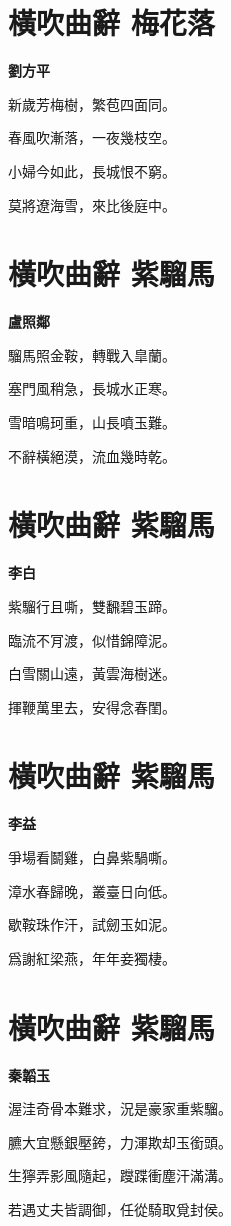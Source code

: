 \documentclass[12pt,a4paper]{ctexbook}
\begin{document}
\section{橫吹曲辭 梅花落}
\textbf{劉方平}\par\vspace{0.5em}
新歲芳梅樹，繁苞四面同。\par
春風吹漸落，一夜幾枝空。\par
小婦今如此，長城恨不窮。\par
莫將遼海雪，來比後庭中。\par

\section{橫吹曲辭 紫騮馬}
\textbf{盧照鄰}\par\vspace{0.5em}
騮馬照金鞍，轉戰入皐蘭。\par
塞門風稍急，長城水正寒。\par
雪暗鳴珂重，山長噴玉難。\par
不辭橫絕漠，流血幾時乾。\par

\section{橫吹曲辭 紫騮馬}
\textbf{李白}\par\vspace{0.5em}
紫騮行且嘶，雙飜碧玉蹄。\par
臨流不肎渡，似惜錦障泥。\par
白雪關山遠，黃雲海樹迷。\par
揮鞭萬里去，安得念春閨。\par

\section{橫吹曲辭 紫騮馬}
\textbf{李益}\par\vspace{0.5em}
爭場看鬬雞，白鼻紫騧嘶。\par
漳水春歸晚，叢臺日向低。\par
歇鞍珠作汗，試劒玉如泥。\par
爲謝紅梁燕，年年妾獨棲。\par

\section{橫吹曲辭 紫騮馬}
\textbf{秦韜玉}\par\vspace{0.5em}
渥洼奇骨本難求，況是豪家重紫騮。\par
臕大宜懸銀壓銙，力渾欺却玉銜頭。\par
生獰弄影風隨起，躞蹀衝塵汗滿溝。\par
若遇丈夫皆調御，任從騎取覓封侯。\par
\end{document}

